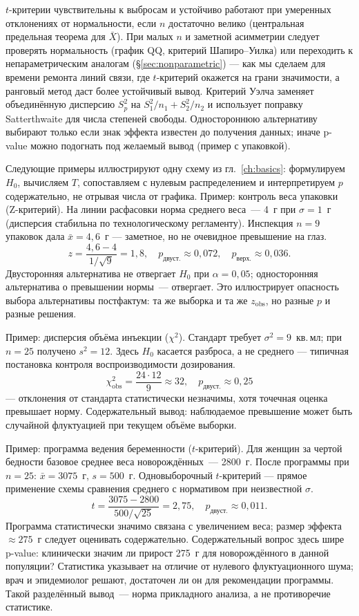 $t$-критерии чувствительны к выбросам и устойчиво работают при умеренных отклонениях от нормальности, если $n$ достаточно велико (центральная предельная теорема для $\bar X$).
При малых $n$ и заметной асимметрии следует проверять нормальность (график QQ, критерий Шапиро--Уилка) или переходить к непараметрическим аналогам (\S\ref{sec:nonparametric}) --- как мы сделаем для времени ремонта линий связи, где $t$-критерий окажется на грани значимости, а ранговый метод даст более устойчивый вывод.
Критерий Уэлча заменяет объединённую дисперсию $S_p^2$ на $S_1^2/n_1+S_2^2/n_2$ и использует поправку Satterthwaite для числа степеней свободы.
Одностороннюю альтернативу выбирают только если знак эффекта известен до получения данных; иначе p-value можно подогнать под желаемый вывод (пример с упаковкой).

Следующие примеры иллюстрируют одну схему из гл.~\ref{ch:basics}: формулируем $H_0$, вычисляем $T$, сопоставляем с нулевым распределением и интерпретируем $p$ содержательно, не отрывая числа от графика.
Пример: контроль веса упаковки (Z-критерий). На линии расфасовки норма среднего веса~--- 4~г при $\sigma=1$~г (дисперсия стабильна по технологическому регламенту).
Инспекция $n=9$ упаковок дала $\bar x=4{,}6$~г --- заметное, но не очевидное превышение на глаз.
\[ z=\frac{4{,}6-4}{1/\sqrt 9}=1{,}8,\quad p_{\text{двуст.}}\approx 0{,}072,\quad p_{\text{верх.}}\approx 0{,}036.
\] Двусторонняя альтернатива не отвергает $H_0$ при $\alpha=0{,}05$; односторонняя альтернатива о превышении нормы~--- отвергает. Это иллюстрирует опасность выбора альтернативы постфактум: та же выборка и та же $z_{\text{obs}}$, но разные $p$ и разные решения.

Пример: дисперсия объёма инъекции ($\chi^2$). Стандарт требует $\sigma^2=9$~кв.\,мл; при $n=25$ получено $s^2=12$.
Здесь $H_0$ касается разброса, а не среднего --- типичная постановка контроля воспроизводимости дозирования.
\[ \chi^2_{\text{obs}}=\frac{24\cdot 12}{9}\approx 32,\quad p_{\text{двуст.}}\approx 0{,}25 \] --- отклонения от стандарта статистически незначимы, хотя точечная оценка превышает норму. Содержательный вывод: наблюдаемое превышение может быть случайной флуктуацией при текущем объёме выборки.

Пример: программа ведения беременности ($t$-критерий). Для женщин за чертой бедности базовое среднее веса новорождённых~--- 2800~г. После программы при $n=25$: $\bar x=3075$~г, $s=500$~г. Одновыборочный $t$-критерий --- прямое применение схемы сравнения среднего с нормативом при неизвестной $\sigma$.
\[ t=\frac{3075-2800}{500/\sqrt{25}}=2{,}75,\quad p_{\text{двуст.}}\approx 0{,}011.
\] Программа статистически значимо связана с увеличением веса; размер эффекта $\approx 275$~г следует оценивать содержательно.
Содержательный вопрос здесь шире p-value: клинически значим ли прирост 275~г для новорождённого в данной популяции? Статистика указывает на отличие от нулевого флуктуационного шума; врач и эпидемиолог решают, достаточен ли он для рекомендации программы.
Такой разделённый вывод~--- норма прикладного анализа, а не противоречие статистике.

